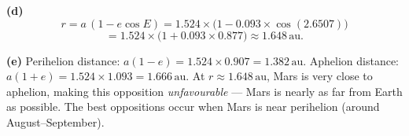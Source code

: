 \documentclass[12pt]{article}
\newenvironment{probbox}[2]{%
  \begin{tcolorbox}[
    enhanced, breakable,
    colback=blue!5!white, colframe=deepblue,
    boxrule=0.8pt, arc=4pt,
    title={\bfseries [#1] Problem #2}
  ]
}{\end{tcolorbox}}
\begin{document}
\begin{probbox}{10 points}{2. Mars at Opposition}
\textbf{(d)}
\begin{equation*}
  r = a\,(1 - e\cos E)
    = 1.524\times\bigl(1 - 0.093\times\cos(2.6507)\bigr) 
    \end{equation*}
\begin{equation*}
    = 1.524\times\bigl(1 + 0.093\times 0.877\bigr)
    \approx 1.648\,\text{au}.
\end{equation*}

\textbf{(e)} Perihelion distance: $a(1-e) = 1.524\times 0.907 = 1.382\,\text{au}$.
Aphelion distance: $a(1+e) = 1.524\times 1.093 = 1.666\,\text{au}$.
At $r \approx 1.648\,\text{au}$, Mars is very close to aphelion, making this
opposition \emph{unfavourable} --- Mars is nearly as far from Earth as possible.
The best oppositions occur when Mars is near perihelion (around August--September).
\end{probbox}

\vspace{0.6cm}
\end{document}
